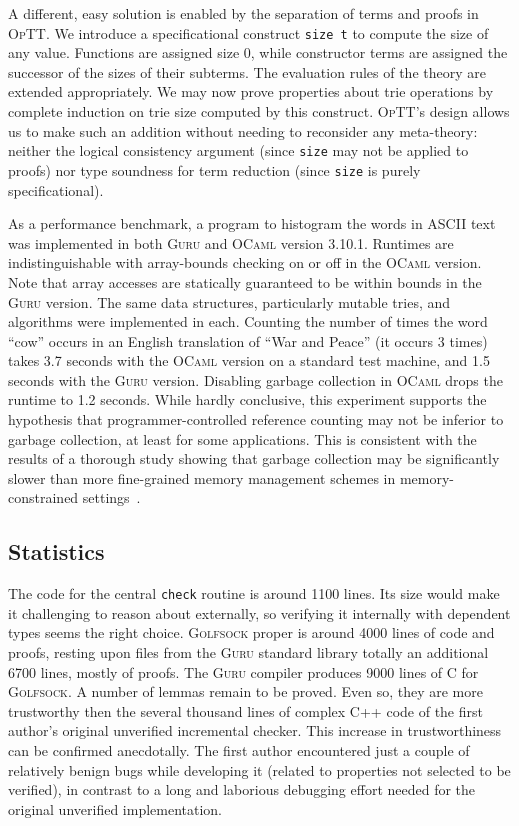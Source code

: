 \documentclass[9pt,natbib]{sigplanconf}
\newcommand{\optt}{\textsc{OpTT}}
\begin{document}
A different, easy solution is enabled by the separation of terms and
proofs in \optt.  We introduce a specificational construct
\texttt{size t} to compute the size of any value.  Functions are
assigned size 0, while constructor terms are assigned the successor of
the sizes of their subterms.  The evaluation rules of the theory are
extended appropriately.  We may now prove properties about trie
operations by complete induction on trie size computed by this
construct.  \optt's design allows us to make such an addition without
needing to reconsider any meta-theory: neither the logical consistency
argument (since \texttt{size} may not be applied to proofs) nor type
soundness for term reduction (since \texttt{size} is purely
specificational).

As a performance benchmark, a program to histogram the words in ASCII
text was implemented in both \textsc{Guru} and \textsc{OCaml} version
3.10.1.  Runtimes are indistinguishable with array-bounds checking on
or off in the \textsc{OCaml} version.  Note that array accesses are
statically guaranteed to be within bounds in the \textsc{Guru}
version.  The same data structures, particularly mutable tries, and
algorithms were implemented in each.  Counting the number of times the
word ``cow'' occurs in an English translation of ``War and Peace'' (it
occurs 3 times) takes 3.7 seconds with the \textsc{OCaml} version on a
standard test machine, and 1.5 seconds with the \textsc{Guru} version.
Disabling garbage collection in \textsc{OCaml} drops the runtime to
1.2 seconds.  While hardly conclusive, this experiment supports the
hypothesis that programmer-controlled reference counting may not be
inferior to garbage collection, at least for some applications.  This
is consistent with the results of a thorough study showing that
garbage collection may be significantly slower than more fine-grained
memory management schemes in memory-constrained
settings~\cite{hertz+05}.

\subsection{Statistics}

The code for the central \texttt{check} routine is around 1100 lines.
Its size would make it challenging to reason about externally, so
verifying it internally with dependent types seems the right choice.
\textsc{Golfsock} proper is around 4000 lines of code and proofs,
resting upon files from the \textsc{Guru} standard library totally an
additional 6700 lines, mostly of proofs.  The \textsc{Guru} compiler
produces 9000 lines of C for \textsc{Golfsock}.  A number of lemmas
remain to be proved.  Even so, they are more trustworthy then the
several thousand lines of complex C++ code of the first author's
original unverified incremental checker. This increase in
trustworthiness can be confirmed anecdotally.  The first author
encountered just a couple of relatively benign bugs while developing
it (related to properties not selected to be verified), in contrast to
a long and laborious debugging effort needed for the original
unverified implementation.
\end{document}
